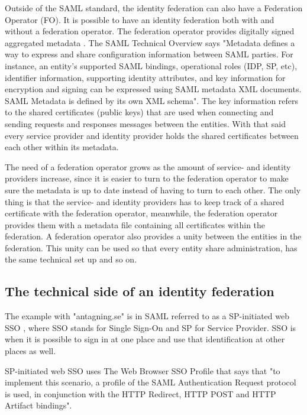 Outside of the SAML standard, the identity federation can also have a Federation Operator (FO). It is possible to have an identity federation both with and without a federation operator. 
The federation operator provides digitally signed aggregated metadata \cite[p.~3]{pdf:Skolfederation}. 
The SAML Technical Overview \cite[p.~16]{pdf:oasis-open} says "Metadata defines a way to express and share configuration information between SAML parties.
For instance, an entity's supported SAML bindings, operational roles (IDP, SP, etc), identifier information,
supporting identity attributes, and key information for encryption and signing can be expressed using SAML
metadata XML documents. SAML Metadata is defined by its own XML schema".
The key information refers to the shared certificates (public keys) that are used when connecting and sending requests and responses 
messages between the entities.
With that said every service provider and identity provider holds the shared certificates between each other within its metadata. 

The need of a federation operator grows as the amount of service- and identity providers increase,
since it is easier to turn to the federation operator to make sure the metadata is up to date 
instead of having to turn to each other. 
The only thing is that the service- and identity providers has to keep track of a shared certificate with the federation operator, 
meanwhile, the federation operator provides them with a metadata file containing all certificates within the federation.
A federation operator also provides a unity between the entities in the federation. This unity can be used so that every entity share 
administration, has the same technical set up and so on.

\subsection{The technical side of an identity federation}
The example with "antagning.se" is in SAML referred to as a SP-initiated web SSO  \cite[p.~12]{pdf:oasis-open}, 
where SSO stands for Single Sign-On and SP for Service Provider. SSO is when it is possible to sign in at one place and use that identification at other places as well. 

SP-initiated web SSO uses The Web Browser SSO Profile \cite[p.~14]{pdf:oasis-open-profiles} that says that "to implement this scenario,
a profile of the SAML Authentication Request protocol is used, in conjunction with the HTTP Redirect, HTTP POST and
HTTP Artifact bindings".

